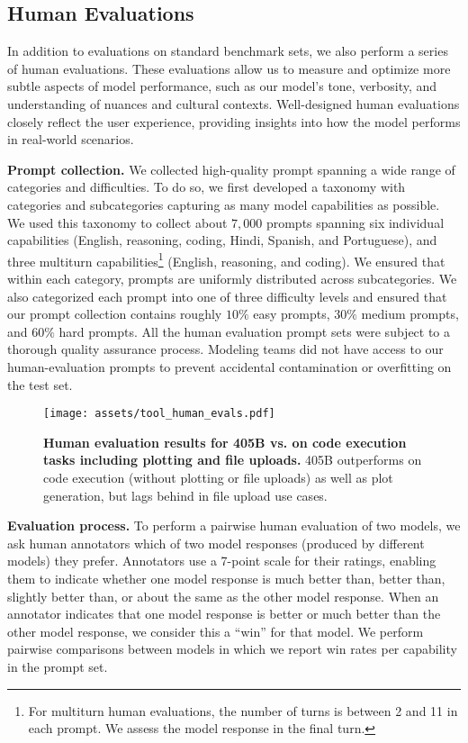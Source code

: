\subsection{Human Evaluations}
\label{section:human_evals}

In addition to evaluations on standard benchmark sets, we also perform a series of human evaluations.
These evaluations allow us to measure and optimize more subtle aspects of model performance, such as our model's tone, verbosity, and understanding of nuances and cultural contexts.
Well-designed human evaluations closely reflect the user experience, providing insights into how the model performs in real-world scenarios.



\textbf{Prompt collection.}
We collected high-quality prompt spanning a wide range of categories and difficulties.
To do so, we first developed a taxonomy with categories and subcategories capturing as many model capabilities as possible.
We used this taxonomy to collect about $7,000$ prompts spanning six individual capabilities (English, reasoning, coding, Hindi, Spanish, and Portuguese), and three multiturn capabilities\footnote{For multiturn human evaluations, the number of turns is between 2 and 11 in each prompt. We assess the model response in the final turn.} (English, reasoning, and coding).
We ensured that within each category, prompts are uniformly distributed across subcategories.
We also categorized each prompt into one of three difficulty levels and ensured that our prompt collection contains roughly $10\%$ easy prompts, $30\%$ medium prompts, and $60\%$ hard prompts.
All the human evaluation prompt sets were subject to a thorough quality assurance process. Modeling teams did not have access to our human-evaluation prompts to prevent accidental contamination or overfitting on the test set.

\begin{figure}[t]
    \centering
    \texttt{[image: assets/tool\_human\_evals.pdf]}
    \caption{\textbf{Human evaluation results for \llamathree 405B vs. \gpto on code execution tasks including plotting and file uploads.} \llamathree 405B outperforms \gpto on code execution (without plotting or file uploads) as well as plot generation, but lags behind in file upload use cases.}
    \label{fig:heval-tool-win-rate}
\end{figure}

\textbf{Evaluation process.}
To perform a pairwise human evaluation of two models, we ask human annotators which of two model responses (produced by different models) they prefer.
Annotators use a 7-point scale for their ratings, enabling them to indicate whether one model response is much better than, better than, slightly better than, or about the same as the other model response.
When an annotator indicates that one model response is better or much better than the other model response, we consider this a ``win'' for that model.
We perform pairwise comparisons between models in which we report win rates per capability in the prompt set.

